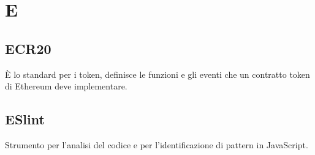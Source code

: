 \section*{E}
\subsection*{ECR20}
È lo standard per i token, definisce le funzioni e gli eventi che un contratto token di Ethereum deve implementare.

\subsection*{ESlint}
Strumento per l’analisi del codice e per l’identificazione di pattern in JavaScript.

